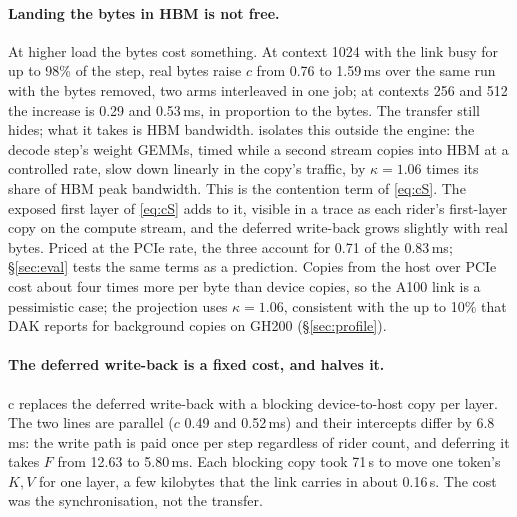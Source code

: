 

\paragraph{Landing the bytes in HBM is not free.} At higher load the bytes
cost something. At context 1024 with the link busy for up to 98\% of the step,
real bytes raise $c$ from 0.76 to 1.59\,ms over the same run with the bytes
removed, two arms interleaved in one job; at contexts 256 and 512 the
increase is 0.29 and 0.53\,ms, in proportion to the bytes. The transfer still
hides; what it takes is HBM bandwidth.  isolates
this outside the engine: the decode step's weight GEMMs, timed while a second
stream copies into HBM at a controlled rate, slow down linearly in the copy's
traffic, by $\kappa = 1.06$ times its share of HBM peak bandwidth. This is the
contention term of \cref{eq:cS}. The exposed first layer of \cref{eq:cS}
adds to it, visible in a trace as each rider's first-layer copy on the
compute stream, and the deferred write-back grows slightly with real bytes.
Priced at the PCIe rate, the three account for 0.71 of the 0.83\,ms;
\S\ref{sec:eval} tests the same terms as a prediction. Copies from the host over PCIe cost about four times
more per byte than device copies, so the A100 link is a pessimistic case; the
projection uses $\kappa = 1.06$, consistent with the up to 10\% that DAK
reports for background copies on GH200 (\S\ref{sec:profile}).

\paragraph{The deferred write-back is a fixed cost, and halves it.}
c replaces the deferred write-back with a blocking
device-to-host copy per layer. The two lines are parallel ($c$ 0.49 and
0.52\,ms) and their intercepts differ by 6.8\,ms: the write path is paid once per
step regardless of rider count, and deferring it takes $F$ from 12.63 to
5.80\,ms. Each blocking copy took 71\,\textmu s to move one token's $K,V$ for
one layer, a few kilobytes that the link carries in about 0.16\,\textmu s. The
cost was the synchronisation, not the transfer.

